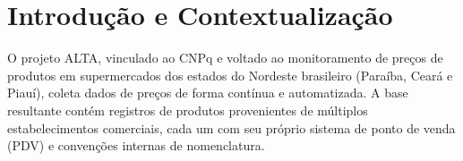 \documentclass[
    article,
    12pt,
    oneside,
    a4paper,
    english,
    brazilian
    ]{abntex2}
\numberwithin{equation}{section}
\newenvironment{dica}{%
    \par\medskip
    \color{blue!60!black}\small\itshape
}{%
    \par\medskip
}
\begin{document}
\textual

\section{Introdução e Contextualização}

%
%

O projeto ALTA, vinculado ao CNPq e voltado ao monitoramento de preços de produtos em supermercados dos estados do Nordeste brasileiro (Paraíba, Ceará e Piauí), coleta dados de preços de forma contínua e automatizada. A base resultante contém registros de produtos provenientes de múltiplos estabelecimentos comerciais, cada um com seu próprio sistema de ponto de venda (PDV) e convenções internas de nomenclatura.
\end{document}
